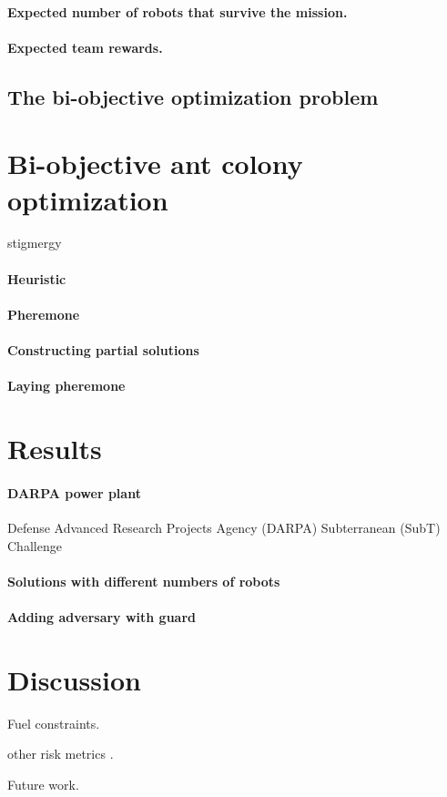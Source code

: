 \documentclass[11pt, oneside]{article}
\begin{document}
\paragraph{Expected number of robots that survive the mission.}

\paragraph{Expected team rewards.}

\subsection{The bi-objective optimization problem}

\section{Bi-objective ant colony optimization}
stigmergy

\paragraph{Heuristic}

\paragraph{Pheremone}

\paragraph{Constructing partial solutions}

\paragraph{Laying pheremone}

\section{Results}

\paragraph{DARPA power plant}

Defense Advanced Research Projects Agency (DARPA) Subterranean (SubT) Challenge \cite{chung2023into}

\paragraph{Solutions with different numbers of robots}

\paragraph{Adding adversary with guard}

\section{Discussion}

Fuel constraints.

other risk metrics \cite{majumdar2020should}.

Future work.




\end{document}
